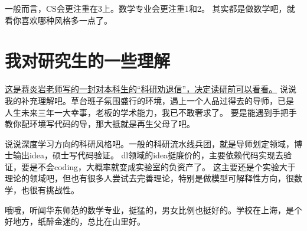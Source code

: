 \documentclass[a4paper, 12pt]{article}
\begin{document}
    一般而言，CS会更注重在3上。数学专业会更注重1和2。
    其实都是做数学吧，就看你喜欢哪种风格多一点了。

    \section{我对研究生的一些理解}
    \href{https://jyywiki.cn/Letter.md}{这是蒋炎岩老师写的一封对本科生的“科研劝退信”，决定读研前可以看看。}
    说说我的补充理解吧。草台班子氛围盛行的环境，遇上一个人品过得去的导师，已是
    人生未来三年一大幸事，老板的学术能力，我已不敢奢求了。
    要是能遇到手把手教你配环境写代码的导，那大抵就是再生父母了吧。
    
    说说深度学习方向的科研风格吧。一般的科研流水线兵团，就是导师划定领域，博士输出idea，硕士写代码验证。
    dl领域的idea挺廉价的，主要依赖代码实现去验证，要是不会coding，大概率就变成实验室的负资产了。
    这主要还是个实验大于理论的领域吧，但也有很多人尝试去完善理论，特别是做模型可解释性方向，很数学，也很有挑战性。
    
    哦哦，听闻华东师范的数学专业，挺猛的，男女比例也挺好的。学校在上海，是个好地方，纸醉金迷的，总比在山里好。
    
    
\end{document}
